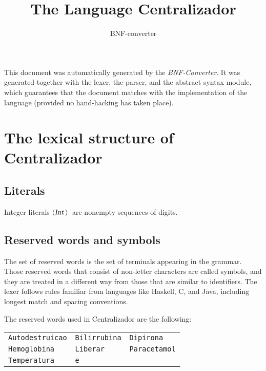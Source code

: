 \documentclass[a4paper,11pt]{article}
\author{BNF-converter}
\title{The Language Centralizador}
\begin{document}
\maketitle

\newcommand{\emptyP}{\mbox{$\epsilon$}}
\newcommand{\terminal}[1]{\mbox{{\texttt {#1}}}}
\newcommand{\nonterminal}[1]{\mbox{$\langle \mbox{{\sl #1 }} \! \rangle$}}
\newcommand{\arrow}{\mbox{::=}}
\newcommand{\delimit}{\mbox{$|$}}
\newcommand{\reserved}[1]{\mbox{{\texttt {#1}}}}
\newcommand{\literal}[1]{\mbox{{\texttt {#1}}}}
\newcommand{\symb}[1]{\mbox{{\texttt {#1}}}}

This document was automatically generated by the {\em BNF-Converter}. It was generated together with the lexer, the parser, and the abstract syntax module, which guarantees that the document matches with the implementation of the language (provided no hand-hacking has taken place).

\section*{The lexical structure of Centralizador}

\subsection*{Literals}
Integer literals \nonterminal{Int}\ are nonempty sequences of digits.




\subsection*{Reserved words and symbols}
The set of reserved words is the set of terminals appearing in the grammar. Those reserved words that consist of non-letter characters are called symbols, and they are treated in a different way from those that are similar to identifiers. The lexer follows rules familiar from languages like Haskell, C, and Java, including longest match and spacing conventions.

The reserved words used in Centralizador are the following: \\

\begin{tabular}{lll}
{\reserved{Autodestruicao}} &{\reserved{Bilirrubina}} &{\reserved{Dipirona}} \\
{\reserved{Hemoglobina}} &{\reserved{Liberar}} &{\reserved{Paracetamol}} \\
{\reserved{Temperatura}} &{\reserved{e}} & \\
\end{tabular}\\
\end{document}
